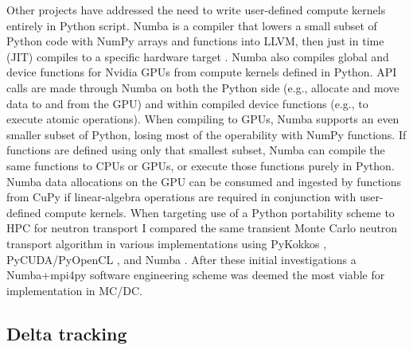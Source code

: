 Other projects have addressed the need to write user-defined compute kernels entirely in Python script.
Numba is a compiler that lowers a small subset of Python code with NumPy arrays and functions into LLVM, then just in time (JIT) compiles to a specific hardware target \cite{lam_numba_2015}. 
Numba also compiles global and device functions for Nvidia GPUs from compute kernels defined in Python.
API calls are made through Numba on both the Python side (e.g., allocate and move data to and from the GPU) and within compiled device functions (e.g., to execute atomic operations).
When compiling to GPUs, Numba supports an even smaller subset of Python, losing most of the operability with NumPy functions.
If functions are defined using only that smallest subset, Numba can compile the same functions to CPUs or GPUs, or execute those functions purely in Python.
Numba data allocations on the GPU can be consumed and ingested by functions from CuPy if linear-algebra operations are required in conjunction with user-defined compute kernels.
When targeting use of a Python portability scheme to HPC for neutron transport I compared the same transient Monte Carlo neutron transport algorithm in various implementations using PyKokkos \cite{AlAwarETAL21PyKokkos}, PyCUDA/PyOpenCL \cite{kloeckner_pycuda_2012}, and Numba \cite{morgan2022}.
After these initial investigations a Numba+mpi4py software engineering scheme was deemed the most viable for implementation in MC/DC.



%

\subsection{Delta tracking}

